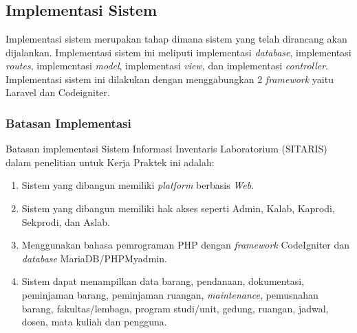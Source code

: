 %
%
%
%

\chapter{\babLima}

\section{Implementasi Sistem}
Implementasi sistem merupakan tahap dimana sistem yang telah dirancang akan dijalankan. Implementasi sistem ini meliputi implementasi \textit{database}, implementasi \textit{routes}, implementasi \textit{model}, implementasi \textit{view}, dan implementasi \textit{controller}. Implementasi sistem ini dilakukan dengan menggabungkan 2 \textit{framework} yaitu Laravel dan Codeigniter.

\subsection{Batasan Implementasi}
Batasan implementasi Sistem Informasi Inventaris Laboratorium (SITARIS) dalam penelitian untuk Kerja Praktek ini adalah:
\begin{enumerate}
	\item Sistem yang dibangun memiliki \textit{platform} berbasis\textit{ Web}.
	\item Sistem yang dibangun memiliki hak akses seperti Admin, Kalab, Kaprodi, Sekprodi, dan Aslab.
	\item Menggunakan bahasa pemrograman PHP dengan \textit{framework} CodeIgniter dan \textit{database} MariaDB/PHPMyadmin.
	\item Sistem dapat menampilkan data barang, pendanaan, dokumentasi, peminjaman barang, peminjaman ruangan, \textit{maintenance}, pemusnahan barang, fakultas/lembaga, program studi/unit, gedung, ruangan, jadwal, dosen, mata kuliah dan pengguna.
\end{enumerate}

